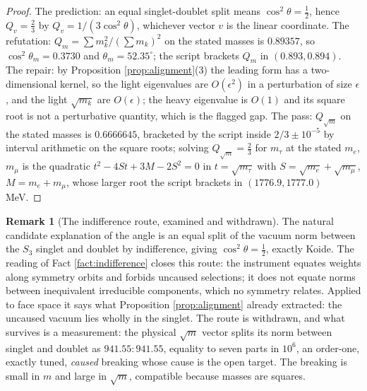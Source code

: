 \documentclass[11pt]{article}
\theoremstyle{definition}
\newtheorem{remark}[theorem]{Remark}
\begin{document}
\begin{proof}
The prediction: an equal singlet-doublet split means $\cos^{2}\theta = \tfrac12$, hence $Q_{v} = \tfrac23$ by $Q_{v} = 1/(3\cos^{2}\theta)$, whichever vector $v$ is the linear coordinate. The refutation: $Q_{m} = \sum m_{k}^{2}/(\sum m_{k})^{2}$ on the stated masses is $0.89357$, so $\cos^{2}\theta_{m} = 0.3730$ and $\theta_{m} = 52.35^{\circ}$; the script brackets $Q_{m}$ in $(0.893, 0.894)$. The repair: by Proposition \ref{prop:alignment}(3) the leading form has a two-dimensional kernel, so the light eigenvalues are $O(\epsilon^{2})$ in a perturbation of size $\epsilon$, and the light $\sqrt{m_{k}}$ are $O(\epsilon)$; the heavy eigenvalue is $O(1)$ and its square root is not a perturbative quantity, which is the flagged gap. The pass: $Q_{\sqrt{m}}$ on the stated masses is $0.6666645$, bracketed by the script inside $2/3 \pm 10^{-5}$ by interval arithmetic on the square roots; solving $Q_{\sqrt{m}} = \tfrac23$ for $m_{\tau}$ at the stated $m_{e}$, $m_{\mu}$ is the quadratic $t^{2} - 4St + 3M - 2S^{2} = 0$ in $t = \sqrt{m_{\tau}}$ with $S = \sqrt{m_{e}} + \sqrt{m_{\mu}}$, $M = m_{e} + m_{\mu}$, whose larger root the script brackets in $(1776.9, 1777.0)$ MeV.
\end{proof}

\begin{remark}[The indifference route, examined and withdrawn]\label{rem:withdrawn}
The natural candidate explanation of the angle is an equal split of the vacuum norm between the $S_{3}$ singlet and doublet by indifference, giving $\cos^{2}\theta = \tfrac12$, exactly Koide. The reading of Fact \ref{fact:indifference} closes this route: the instrument equates weights along symmetry orbits and forbids uncaused selections; it does not equate norms between inequivalent irreducible components, which no symmetry relates. Applied to face space it says what Proposition \ref{prop:alignment} already extracted: the uncaused vacuum lies wholly in the singlet. The route is withdrawn, and what survives is a measurement: the physical $\sqrt{m}$ vector splits its norm between singlet and doublet as $941.55 : 941.55$, equality to seven parts in $10^{6}$, an order-one, exactly tuned, \emph{caused} breaking whose cause is the open target. The breaking is small in $m$ and large in $\sqrt{m}$, compatible because masses are squares.
\end{remark}
\end{document}
